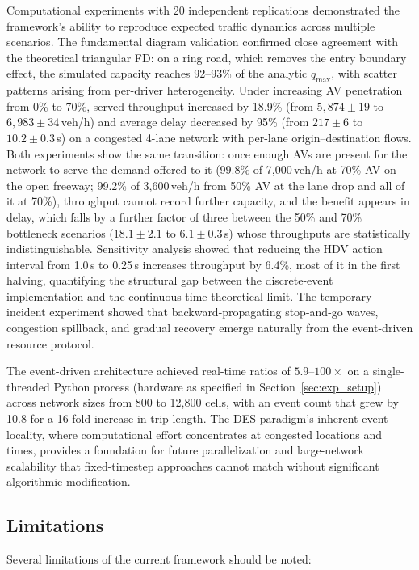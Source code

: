 \documentclass[review,authoryear]{elsarticle}
\begin{document}
Computational experiments with 20 independent replications demonstrated the framework's ability to reproduce expected traffic dynamics across multiple scenarios. The fundamental diagram validation confirmed close agreement with the theoretical triangular FD: on a ring road, which removes the entry boundary effect, the simulated capacity reaches 92--93\% of the analytic $q_{\max}$, with scatter patterns arising from per-driver heterogeneity. Under increasing AV penetration from 0\% to 70\%, served throughput increased by 18.9\% (from $5{,}874 \pm 19$ to $6{,}983 \pm 34$\,veh/h) and average delay decreased by 95\% (from $217 \pm 6$ to $10.2 \pm 0.3$\,s) on a congested 4-lane network with per-lane origin--destination flows. Both experiments show the same transition: once enough AVs are present for the network to serve the demand offered to it (99.8\% of 7{,}000\,veh/h at 70\% AV on the open freeway; 99.2\% of 3{,}600\,veh/h from 50\% AV at the lane drop and all of it at 70\%), throughput cannot record further capacity, and the benefit appears in delay, which falls by a further factor of three between the 50\% and 70\% bottleneck scenarios ($18.1 \pm 2.1$ to $6.1 \pm 0.3$\,s) whose throughputs are statistically indistinguishable. Sensitivity analysis showed that reducing the HDV action interval from 1.0\,s to 0.25\,s increases throughput by 6.4\%, most of it in the first halving, quantifying the structural gap between the discrete-event implementation and the continuous-time theoretical limit. The temporary incident experiment showed that backward-propagating stop-and-go waves, congestion spillback, and gradual recovery emerge naturally from the event-driven resource protocol.

The event-driven architecture achieved real-time ratios of $5.9$--$100\times$ on a single-threaded Python process (hardware as specified in Section~\ref{sec:exp_setup}) across network sizes from 800 to 12{,}800 cells, with an event count that grew by 10.8 for a 16-fold increase in trip length. The DES paradigm's inherent event locality, where computational effort concentrates at congested locations and times, provides a foundation for future parallelization and large-network scalability that fixed-timestep approaches cannot match without significant algorithmic modification.

\subsection{Limitations}

Several limitations of the current framework should be noted:
\end{document}
